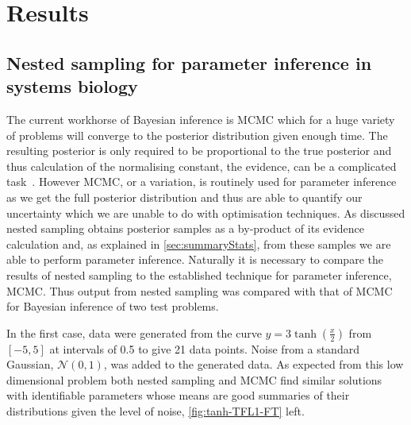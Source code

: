 \section{Results}

\subsection{Nested sampling for parameter inference in systems biology}

The current workhorse of Bayesian inference is MCMC which for a huge variety of problems will converge to the posterior distribution given enough time.
The resulting posterior is only required to be proportional to the true posterior and thus calculation of the normalising constant, the evidence, can be a complicated task~\cite{mackay2003, Skilling2006}.
However MCMC, or a variation, is routinely used for parameter inference as we get the full posterior distribution and thus are able to quantify our uncertainty which we are unable to do with optimisation techniques.
As discussed nested sampling obtains posterior samples as a by-product of its evidence calculation and, as explained in \autoref{sec:summaryStats}, from these samples we are able to perform parameter inference.
Naturally it is necessary to compare the results of nested sampling to the established technique for parameter inference, MCMC.
Thus output from nested sampling was compared with that of MCMC for Bayesian inference of two test problems.

In the first case, data were generated from the curve $y = 3\tanh\left(\frac{x}{2}\right)$ from $[-5,5]$ at intervals of 0.5 to give 21 data points.
Noise from a standard Gaussian, $\mathcal N(0,1)$, was added to the generated data.
As expected from this low dimensional problem both nested sampling and MCMC find similar solutions with identifiable parameters whose means are good summaries of their distributions given the level of noise, \autoref{fig:tanh-TFL1-FT} left.

